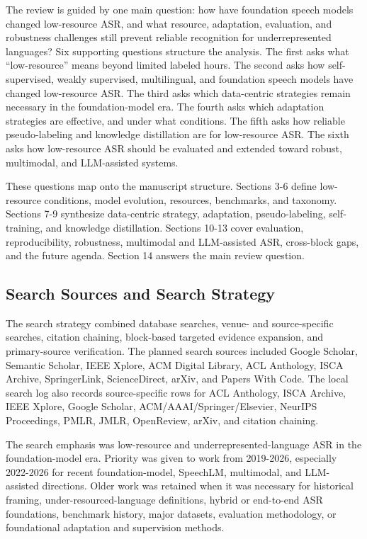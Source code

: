 \documentclass[pdflatex,sn-basic]{sn-jnl}
\theoremstyle{thmstyleone}
\theoremstyle{thmstyletwo}
\theoremstyle{thmstylethree}
\begin{document}
The review is guided by one main question: how have foundation speech models changed low-resource ASR, and what resource, adaptation, evaluation, and robustness challenges still prevent reliable recognition for underrepresented languages? Six supporting questions structure the analysis. The first asks what ``low-resource'' means beyond limited labeled hours. The second asks how self-supervised, weakly supervised, multilingual, and foundation speech models have changed low-resource ASR. The third asks which data-centric strategies remain necessary in the foundation-model era. The fourth asks which adaptation strategies are effective, and under what conditions. The fifth asks how reliable pseudo-labeling and knowledge distillation are for low-resource ASR. The sixth asks how low-resource ASR should be evaluated and extended toward robust, multimodal, and LLM-assisted systems.

These questions map onto the manuscript structure. Sections 3-6 define low-resource conditions, model evolution, resources, benchmarks, and taxonomy. Sections 7-9 synthesize data-centric strategy, adaptation, pseudo-labeling, self-training, and knowledge distillation. Sections 10-13 cover evaluation, reproducibility, robustness, multimodal and LLM-assisted ASR, cross-block gaps, and the future agenda. Section 14 answers the main review question.

\subsection{Search Sources and Search Strategy}

The search strategy combined database searches, venue- and source-specific searches, citation chaining, block-based targeted evidence expansion, and primary-source verification. The planned search sources included Google Scholar, Semantic Scholar, IEEE Xplore, ACM Digital Library, ACL Anthology, ISCA Archive, SpringerLink, ScienceDirect, arXiv, and Papers With Code. The local search log also records source-specific rows for ACL Anthology, ISCA Archive, IEEE Xplore, Google Scholar, ACM/AAAI/Springer/Elsevier, NeurIPS Proceedings, PMLR, JMLR, OpenReview, arXiv, and citation chaining.

The search emphasis was low-resource and underrepresented-language ASR in the foundation-model era. Priority was given to work from 2019-2026, especially 2022-2026 for recent foundation-model, SpeechLM, multimodal, and LLM-assisted directions. Older work was retained when it was necessary for historical framing, under-resourced-language definitions, hybrid or end-to-end ASR foundations, benchmark history, major datasets, evaluation methodology, or foundational adaptation and supervision methods.
\end{document}
